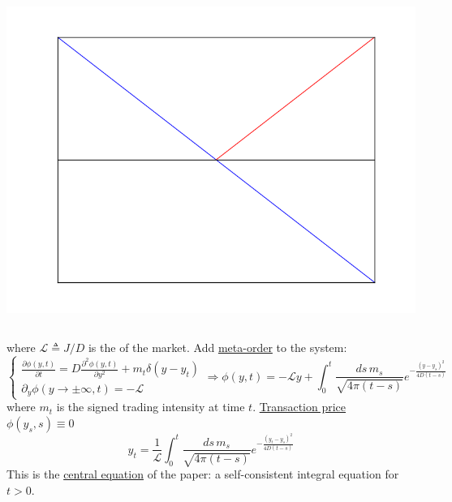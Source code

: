 \documentclass{beamer}
\begin{document}
\begin{frame}
{{\begin{columns}
\begin{column}{0.3\textwidth}
     \includegraphics[width=\textwidth,height=.1\textheight]{linear}
\end{column}
\end{columns}

where $\mathcal{L}\triangleq J/D$ is the \textit{\color{blue}{latent liquidity}} of the market. Add \underline{meta-order}
to the system:
$$
\begin{cases}
\frac{\partial \phi(y,t)}{\partial t} = D\frac{\partial^2 \phi(y,t)}{\partial y^2}  + m_t \delta(y-y_t)\\
\partial_y \phi(y\rightarrow \pm\infty, t) = -\mathcal{L}
\end{cases}
\Rightarrow \phi(y,t) = -\mathcal{L}y + \int_0^t \frac{ds \, m_s}{\sqrt{4\pi(t-s)}} e^{-\frac{(y-y_s)^2}{4D(t-s)}}
$$
where $m_t$ is the signed trading intensity at time $t$. \underline{Transaction price} $\phi(y_s, s)\equiv 0$
$$
\boxed{
y_t = \frac{1}{\mathcal{L}}\int_0^t \frac{ds \, m_s}{\sqrt{4\pi(t-s)}} e^{-\frac{(y_t-y_s)^2}{4D(t-s)}}
}
$$ 
This is the \underline{central equation} of the paper: a self-consistent integral equation for $t>0$.
}
}
\end{frame}
\end{document}
